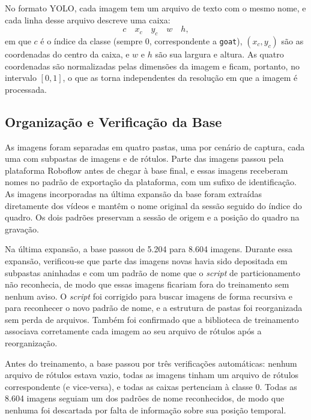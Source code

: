 No formato YOLO, cada imagem tem um arquivo de texto com o mesmo nome, e cada linha desse arquivo descreve uma caixa:
\begin{equation}
    c \quad x_c \quad y_c \quad w \quad h,
    \label{eq:formato-yolo}
\end{equation}
em que $c$ é o índice da classe (sempre 0, correspondente a \texttt{goat}), $(x_c, y_c)$ são as coordenadas do centro da caixa, e $w$ e $h$ são sua largura e altura. As quatro coordenadas são normalizadas pelas dimensões da imagem e ficam, portanto, no intervalo $[0, 1]$, o que as torna independentes da resolução em que a imagem é processada.

\subsection{Organização e Verificação da Base}
\label{subsec:organizacao-base}

As imagens foram separadas em quatro pastas, uma por cenário de captura, cada uma com subpastas de imagens e de rótulos. Parte das imagens passou pela plataforma Roboflow antes de chegar à base final, e essas imagens receberam nomes no padrão de exportação da plataforma, com um sufixo de identificação. As imagens incorporadas na última expansão da base foram extraídas diretamente dos vídeos e mantêm o nome original da sessão seguido do índice do quadro. Os dois padrões preservam a sessão de origem e a posição do quadro na gravação.

Na última expansão, a base passou de 5.204 para 8.604 imagens. Durante essa expansão, verificou-se que parte das imagens novas havia sido depositada em subpastas aninhadas e com um padrão de nome que o \textit{script} de particionamento não reconhecia, de modo que essas imagens ficariam fora do treinamento sem nenhum aviso. O \textit{script} foi corrigido para buscar imagens de forma recursiva e para reconhecer o novo padrão de nome, e a estrutura de pastas foi reorganizada sem perda de arquivos. Também foi confirmado que a biblioteca de treinamento associava corretamente cada imagem ao seu arquivo de rótulos após a reorganização.

Antes do treinamento, a base passou por três verificações automáticas: nenhum arquivo de rótulos estava vazio, todas as imagens tinham um arquivo de rótulos correspondente (e vice-versa), e todas as caixas pertenciam à classe 0. Todas as 8.604 imagens seguiam um dos padrões de nome reconhecidos, de modo que nenhuma foi descartada por falta de informação sobre sua posição temporal.

